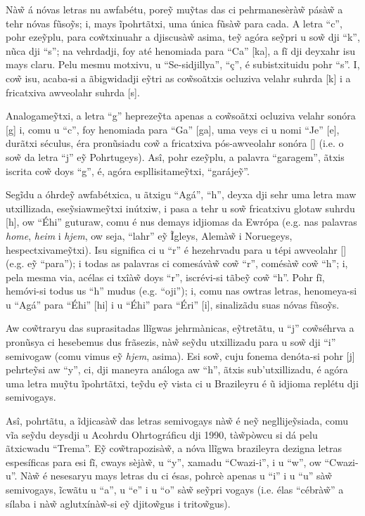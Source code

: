 \documentclass[12pt, a5paper, titlepage]{article}
\begin{document}
\begin{bilingualpages}
    Nà\~w á nóvas letras nu awfabétu, pore\~y mu\~ytas das ci pehrmanesèrà\~w
    pásà\~w a tehr nóvas fũso\~ys; i, mays ĩpohrtãtxi, uma única fũsà\~w para cada.
    A letra ``c'', pohr eze\~yplu, para co\~wtxinuahr a djiscusà\~w asima, te\~y
    agóra se\~ypri u so\~w dji ``k'', nũca dji ``s''; na vehrdadji, foy até
    henomiada para ``Ca'' [ka], a fĩ dji deyxahr isu mays claru. Pelu mesmu
    motxivu, u ``Se-sidjillya'', ``ç'', é subistxituidu pohr ``s''. I, co\~w isu,
    acaba-si a ãbigwidadji e\~ytri as co\~wsoãtxis ocluziva velahr suhrda [k] i a
    fricatxiva awveolahr suhrda [s].

    Analogame\~ytxi, a letra ``g'' hepreze\~yta apenas a co\~wsoãtxi ocluziva
    velahr sonóra [g] i, comu u ``c'', foy henomiada para ``Ga'' [ga], uma veys ci
    u nomi ``Je'' [\textyogh e], durãtxi séculus, éra pronũsiadu co\~w a fricatxiva
    pós-awveolahr sonóra [\textyogh] (i.e. o so\~w da letra ``j'' e\~y Pohrtugeys).
    Asî, pohr eze\~yplu, a palavra ``garagem'', ãtxis iscrita co\~w doys ``g'', é,
    agóra espllisitame\~ytxi, ``garáje\~y''.

    Segĩdu a óhrde\~y awfabétxica, u ãtxigu ``Agá'', ``h'', deyxa dji sehr uma
    letra maw utxillizada, ese\~ysiawme\~ytxi inútxiw, i pasa a tehr u so\~w
    fricatxivu glotaw suhrdu [h], ow ``Éhi'' guturaw, comu é nus demays idjiomas da
    Ewrópa (e.g. nas palavras \textit{home}, \textit{heim} i \textit{hjem}, ow
    seja, ``lahr'' e\~y Ĩgleys, Alemà\~w i Noruegeys, hespectxivame\~ytxi). Isu
    significa ci u ``r'' é hezehrvadu para u tépi awveolahr [\textfishhookr] (e.g.
    e\~y ``para''); i todas as palavras ci comesávà\~w co\~w ``r'', comésà\~w co\~w
    ``h''; i, pela mesma via, acélas ci txîà\~w doys ``r'', iscrévi-si tãbe\~y
    co\~w ``h''. Pohr fĩ, hemóvi-si todus us ``h'' mudus (e.g. ``oji''); i, comu
    nas owtras letras, henomeya-si u ``Agá'' para ``Éhi'' [\textepsilon hi] i u
    ``Éhi'' para ``Éri'' [\textepsilon \textfishhookr i], sinalizãdu suas nóvas
    fũso\~ys.

    Aw co\~wtraryu das suprasitadas llĩgwas jehrmànicas, e\~ytretãtu, u ``j''
    co\~wséhrva a pronũsya ci hesebemus dus frãsezis, nà\~w se\~ydu utxillizadu
    para u so\~w dji ``i'' semivogaw (comu vimus e\~y \textit{hjem}, asima). Esi
    so\~w, cuju fonema denóta-si pohr [j] pehrte\~ysi aw ``y'', ci, dji maneyra
    análoga aw ``h'', ãtxis sub'utxillizadu, é agóra uma letra mu\~ytu ĩpohrtãtxi,
    te\~ydu e\~y vista ci u Brazileyru é ũ idjioma replétu dji semivogays.

    Asî, pohrtãtu, a ĩdjicasà\~w das letras semivogays nà\~w é ne\~y
    negllije\~ysiada, comu vĩa se\~ydu deysdji u Acohrdu Ohrtográficu dji 1990,
    tà\~wpòwcu si dá pelu ãtxicwadu ``Trema''. E\~y co\~wtrapozisà\~w, a nóva
    llĩgwa brazileyra dezigna letras espesíficas para esi fĩ, cways sèjà\~w, u
    ``y'', xamadu ``Cwazi-i'', i u ``w'', ow ``Cwazi-u''. Nà\~w é nesesaryu mays
    letras du ci ésas, pohrcè apenas u ``i'' i u ``u'' sà\~w semivogays, ĩcwãtu u
    ``a'', u ``e'' i u ``o'' sà\~w se\~ypri vogays (i.e. élas ``cébrà\~w'' a sílaba
    i nà\~w aglutxínà\~w-si e\~y djito\~wgus i trito\~wgus).


\end{bilingualpages}
\end{document}
